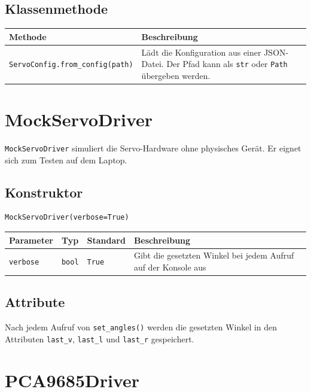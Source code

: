\documentclass[11pt, a4paper]{scrreprt}
\begin{document}
\subsection*{Klassenmethode}

\begin{tabularx}{\textwidth}{l X}
  \toprule
  Methode & Beschreibung \\
  \midrule
  \texttt{ServoConfig.from\_config(path)} & Lädt die Konfiguration aus einer JSON-Datei. Der Pfad kann als \texttt{str} oder \texttt{Path} übergeben werden. \\
  \bottomrule
\end{tabularx}

\section{MockServoDriver}

\texttt{MockServoDriver} simuliert die Servo-Hardware ohne physisches Gerät.
Er eignet sich zum Testen auf dem Laptop.

\subsection*{Konstruktor}

\begin{lstlisting}
MockServoDriver(verbose=True)
\end{lstlisting}

\begin{tabularx}{\textwidth}{l l l X}
  \toprule
  Parameter & Typ & Standard & Beschreibung \\
  \midrule
  \texttt{verbose} & \texttt{bool} & \texttt{True} & Gibt die gesetzten Winkel bei jedem Aufruf auf der Konsole aus \\
  \bottomrule
\end{tabularx}

\subsection*{Attribute}

Nach jedem Aufruf von \texttt{set\_angles()} werden die gesetzten Winkel
in den Attributen \texttt{last\_v}, \texttt{last\_l} und \texttt{last\_r} gespeichert.

\section{PCA9685Driver}
\end{document}
